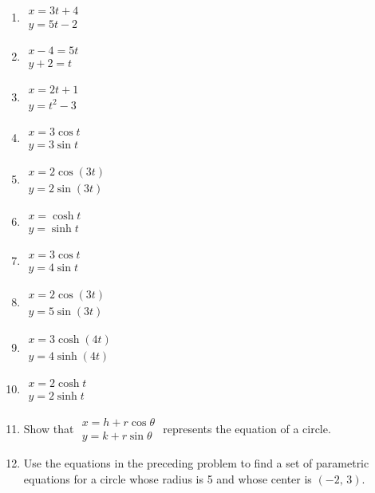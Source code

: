 \documentclass{exercises}
\begin{document}
\begin{enumerate}[resume]
\item $\begin{array}{l}x=3t+4 \\ y=5t-2\end{array}$
\item $\begin{array}{l}x-4=5t \\ y+2=t\end{array}$
\item $\begin{array}{l}x=2t+1 \\ y=t^{2}-3\end{array}$
\item $\begin{array}{l}x=3\cos t \\ y=3\sin t\end{array}$
\item $\begin{array}{l}x=2\cos(3t) \\ y=2\sin(3t)\end{array}$
\item $\begin{array}{l}x=\cosh t \\ y=\sinh t\end{array}$
\item $\begin{array}{l}x=3\cos t \\ y=4\sin t\end{array}$
\item $\begin{array}{l}x=2\cos(3t) \\ y=5\sin(3t)\end{array}$
\item $\begin{array}{l}x=3\cosh(4t) \\ y=4\sinh(4t)\end{array}$
\item $\begin{array}{l}x=2\cosh t \\ y=2\sinh t\end{array}$
\item Show that $\begin{array}{l}x=h+r\cos \theta \\ y=k+r\sin \theta \end{array}$ represents the equation of a circle.
\item Use the equations in the preceding problem to find a set of parametric equations for a circle whose radius is 5 and whose center is $(-2,\,3)$.
\end{enumerate}
\end{document}
